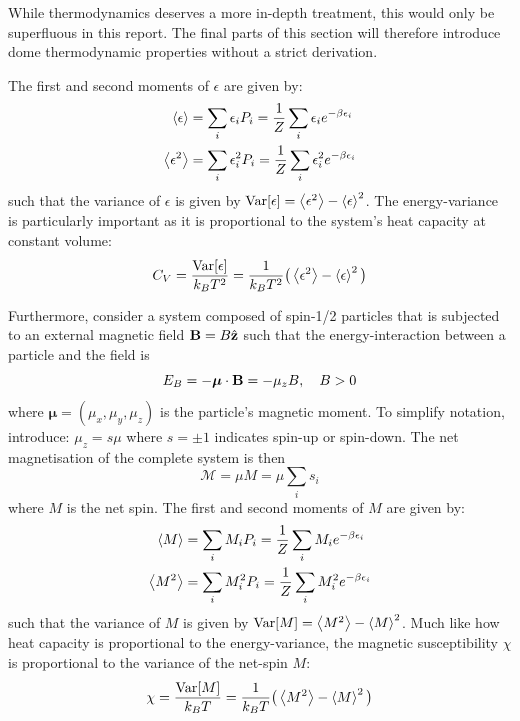 \documentclass[nofootinbib,reprint,english]{revtex4-1}
\begin{document}
While thermodynamics deserves a more in-depth treatment, this would only be superfluous in this report. The final parts of this section will therefore introduce dome thermodynamic properties without a strict derivation.

The first and second moments of \(\epsilon\) are given by:
\begin{subequations}\label{eq:energy_moments}
\begin{align}
\expval{\epsilon}  &=\sum_i\epsilon_iP_i=\frac{1}{Z}\sum_i\epsilon_ie^{-\beta\epsilon_i}\\
\expval{\epsilon^2}&=\sum_i\epsilon_i^2P_i=\frac{1}{Z}\sum_i\epsilon_i^2e^{-\beta\epsilon_i}
\end{align}
\end{subequations}
such that the variance of \(\epsilon\) is given by \(\text{Var}[\epsilon]=\expval{\epsilon^2}-\expval{\epsilon}^2\). The energy-variance is particularly important as it is proportional to the system's heat capacity at constant volume:
\begin{equation}\label{eq:heat_capacity}
C_V=\frac{\text{Var}[\epsilon]}{k_BT^2}=\frac{1}{k_BT^2}\big(\expval{\epsilon^2}-\expval{\epsilon}^2\big)
\end{equation}

Furthermore, consider a system composed of spin-1/2 particles that is subjected to an external magnetic field \(\vb{B}=B\hat{\vb{z}}\) such that the energy-interaction between a particle and the field is
\begin{equation}\label{eq:magnetic_energy_interaction}
E_B=-\boldsymbol{\mu}\cdot\vb{B}=-\mu_zB\qc B>0
\end{equation}
where \(\boldsymbol{\mu}=(\mu_x,\mu_y,\mu_z)\) is the particle's magnetic moment. To simplify notation, introduce: \(\mu_z=s\mu\) where \(s=\pm1\) indicates spin-up or spin-down. The net magnetisation of the complete system is then
\begin{equation}\label{eq:net_magnetisation}
\mathcal{M}=\mu M=\mu\sum_is_i
\end{equation}
where \(M\) is the net spin. The first and second moments of \(M\) are given by:
\begin{subequations}\label{eq:magnetisation_moments}
\begin{align}
\expval{M}  &=\sum_iM_iP_i=\frac{1}{Z}\sum_iM_ie^{-\beta\epsilon_i}\\
\expval{M^2}&=\sum_iM_i^2P_i=\frac{1}{Z}\sum_iM_i^2e^{-\beta\epsilon_i}
\end{align}
\end{subequations}
such that the variance of \(M\) is given by \(\text{Var}[M]=\expval{M^2}-\expval{M}^2\). Much like how heat capacity is proportional to the energy-variance, the magnetic susceptibility \(\chi\) is proportional to the variance of the net-spin \(M\):
\begin{equation}\label{eq:magnetic_sucseptibility}
\chi=\frac{\text{Var}[M]}{k_BT}=\frac{1}{k_BT}\big(\expval{M^2}-\expval{M}^2\big)
\end{equation}
\end{document}
